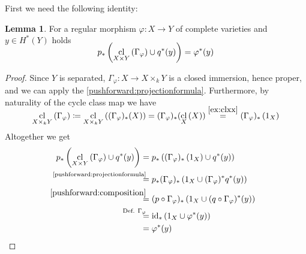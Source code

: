 \documentclass[english]{scrartcl}
\theoremstyle{definition}
\newtheorem{Lem}[Def]{Lemma}
\theoremstyle{remark}
\newcommand*{\id}{\text{id}} %
\newcommand*{\Graph}[1]{{\Gamma_{#1}}} %
\DeclareMathOperator{\CL}{cl} %
\newcommand*{\cl}[2]{{\CL_{#1}\left(#2\right)}} %
\newcommand*{\one}[1]{{1_{#1}}}%
\renewcommand*{\phi}{\varphi}
\begin{document}
    First we need the following identity:
    \begin{Lem}\label{step1}
      For a regular morphism $\phi\colon X\to Y$ of complete varieties
      and $y\in H^*(Y)$ holds
      \begin{gather*}
        \SwapAboveDisplaySkip
        p_*\left(\cl{X\times Y}{\Graph{\phi}} \cup q^*(y)\right)
        = \phi^*(y)           
      \end{gather*}
      \begin{proof}
        Since $Y$ is separated, $\Graph{\phi}\colon X\to X\times_k Y$
        is a closed immersion, hence proper, and we can apply the
        \ref{pushforward:projectionformula}.
        Furthermore, by naturality of the cycle class map we have
        \begin{gather}
          \SwapAboveDisplaySkip
          \cl{X\times_k Y}{\Graph{\phi}} \coloneqq
          \cl{X\times_k Y}{(\Graph{\phi})_*(X)} =
          (\Graph{\phi})_*(\cl{X}{X}) \overset{\ref{ex:clxx}}{=} %
          (\Graph{\phi})_*\left(\one{X}\right)
        \end{gather}
        Altogether we get
        \begin{align*}
          p_*\left(\cl{X\times Y}{\Graph{\phi}} \cup q^*(y)\right)
          &=  p_*\left(
            (\Graph{\phi})_*\left(\one{X}\right) \cup q^*(y)
            \right)\\
          &\overset{\mathllap{\text{\ref{pushforward:projectionformula}}}}{=}
            p_*(\Graph{\phi})_*\left( \one{X} \cup (\Graph{\phi})^*q^*(y) \right)\\
          &\overset{\mathllap{\ref{pushforward:composition}}}=
            (p\circ\Graph{\phi})_* \left(
            \one{X} \cup (q\circ\Graph{\phi})^*(y) \right)\\
          &\overset{\mathllap{\text{Def. $\Graph\phi$}}}=
            \id_* \left( \one{X} \cup \phi^*(y) \right)\\
          &= \phi^*(y)
        \end{align*}
      \end{proof}
    \end{Lem}
\end{document}
